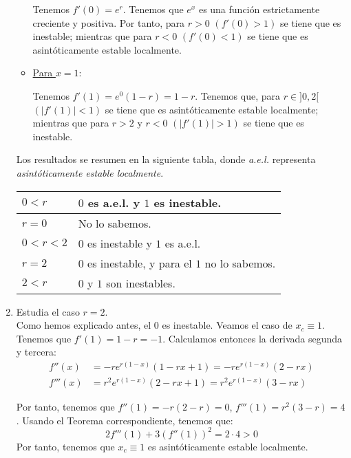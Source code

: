 \begin{ejercicio}
\begin{enumerate}
\begin{itemize}
            Tenemos $f'(0) = e^r$. Tenemos que $e^x$ es una función estrictamente creciente y positiva. Por tanto, para $r>0$ $(f'(0)>1)$ se tiene que es inestable; mientras que para $r<0$ $(f'(0)<1)$ se tiene que es asintóticamente estable localmente.

            \item \ul{Para $x=1$}:

            Tenemos $f'(1) = e^0(1-r) = 1-r$. Tenemos que, para $r\in ]0,2[$ $(|f'(1)|<1)$ se tiene que es asintóticamente estable localmente; mientras que para $r>2$ y $r<0$ $(|f'(1)|>1)$ se tiene que es inestable.
        \end{itemize}

        Los resultados se resumen en la siguiente tabla, donde \emph{a.e.l.} representa \emph{asintóticamente estable localmente}.
        \begin{table}[H]
            \centering
            \begin{tabular}{l|l}
                $0< r$ & $0$ es a.e.l. y $1$ es inestable.\\ \hline
                $r=0$ & No lo sabemos. \\ \hline
                $0<r<2$ & $0$ es inestable y $1$ es a.e.l.\\ \hline
                $r=2$ & $0$ es inestable, y para el $1$ no lo sabemos. \\ \hline
                $2<r$ & $0$ y $1$ son inestables.\\
            \end{tabular}
        \end{table}
        
        \item Estudia el caso $r = 2$.\\

        Como hemos explicado antes, el $0$ es inestable. Veamos el caso de $x_c\equiv 1$. Tenemos que $f'(1)=1-r=-1$. Calculamos entonces la derivada segunda y tercera:
        \begin{align*}
            f''(x)&= -re^{r(1-x)}(1-rx +1) = -re^{r(1-x)}(2-rx)\\
            f'''(x)&= r^2e^{r(1-x)}(2-rx+1) = r^2e^{r(1-x)}(3-rx)
        \end{align*}

        Por tanto, tenemos que $f''(1)=-r(2-r) = 0$, $f'''(1)=r^2(3-r) = 4$. Usando el Teorema correspondiente, tenemos que:
        \begin{equation*}
            2f'''(1) + 3(f''(1))^2 = 2\cdot 4 > 0
        \end{equation*}
        Por tanto, tenemos que $x_c\equiv 1$ es asintóticamente estable localmente.
        

\end{enumerate}
\end{ejercicio}
